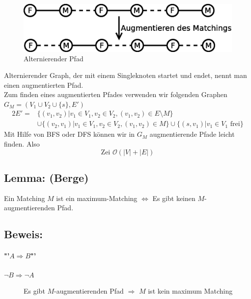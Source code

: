 \begin{figure}
	\centering
	\includegraphics[width=\linewidth]{23/Grafik/Diagramm4}
	\caption{Alternierender Pfad}
	\label{fig:Diagramm4}
\end{figure}
Alternierender Graph, der mit einem Singleknoten startet und endet, nennt man einen augmentierten Pfad.\\


Zum finden eines augmentierten Pfades verwenden wir folgenden Graphen \\
$G_M = (V_1\cup V_2\cup \{ s \}, E')$
\begin{alignat*}{2} E'= &
\{ (v_1,v_2)|v_1\in V_1, v_2\in V_2, (v_1,v_2)\in E\setminus M \}\\
&\cup\{ (v_2,v_1)|v_1\in V_1, v_2\in V_2, (v_1,v_2)\in M \} \cup \{ (s,v_1)|v_1\in V_1 \text{ frei}\}
 \end{alignat*}
 Mit Hilfe von BFS oder DFS können wir in $G_M$ augmentierende Pfade leicht finden. Also
 \[ \text{Zei } \mathcal{O}(|V|+|E|)\]
 \subsection{Lemma: (Berge)}
 Ein Matching $M$ ist ein maximum-Matching $\Leftrightarrow$ Es gibt keinen $M$-augmentierenden Pfad.
 \subsection{Beweis:}
 \paragraph{"'$A\Rightarrow B$"'}
\begin{description}
 	\item[$\neg B \Rightarrow \neg A$] Es gibt $M$-augmentierenden Pfad $\Rightarrow$ $M$ ist kein maximum Matching
 \end{description}
